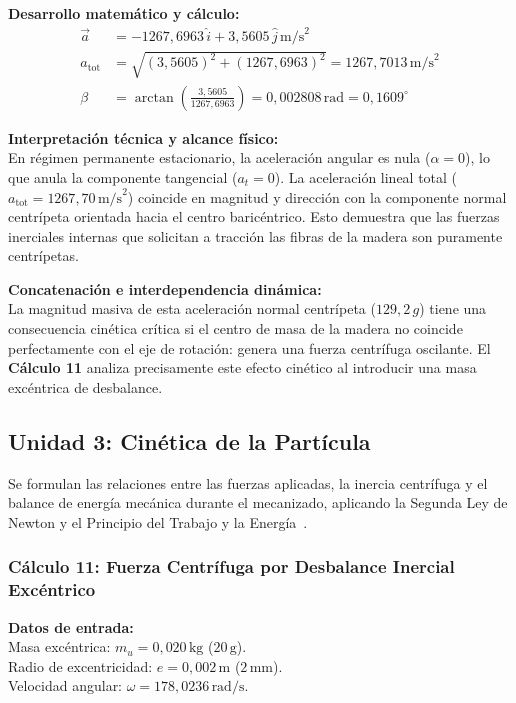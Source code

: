 \documentclass[12pt,a4paper]{article}
\begin{document}
\noindent\textbf{Desarrollo matemático y cálculo:}
\begin{align}
    \vec{a} &= -1267{,}6963\,\hat{i} + 3{,}5605\,\hat{j}\,\text{m/s}^2 \\[6pt]
    a_{\text{tot}} &= \sqrt{(3{,}5605)^2 + (1267{,}6963)^2} = \boxed{1267{,}7013\,\text{m/s}^2} \\[6pt]
    \beta &= \arctan\left(\frac{3{,}5605}{1267{,}6963}\right) = 0{,}002808\,\text{rad} = \boxed{0{,}1609^\circ}
\end{align}
\vspace{6pt}

\noindent\textbf{Interpretación técnica y alcance físico:}\\
En régimen permanente estacionario, la aceleración angular es nula ($\alpha = 0$), lo que anula la componente tangencial ($a_t = 0$). La aceleración lineal total ($a_{\text{tot}} = 1267{,}70\,\text{m/s}^2$) coincide en magnitud y dirección con la componente normal centrípeta orientada hacia el centro baricéntrico. Esto demuestra que las fuerzas inerciales internas que solicitan a tracción las fibras de la madera son puramente centrípetas.

\noindent\textbf{Concatenación e interdependencia dinámica:}\\
La magnitud masiva de esta aceleración normal centrípeta ($129{,}2\,g$) tiene una consecuencia cinética crítica si el centro de masa de la madera no coincide perfectamente con el eje de rotación: genera una fuerza centrífuga oscilante. El \textbf{Cálculo 11} analiza precisamente este efecto cinético al introducir una masa excéntrica de desbalance.

\subsection{Unidad 3: Cinética de la Partícula}
Se formulan las relaciones entre las fuerzas aplicadas, la inercia centrífuga y el balance de energía mecánica durante el mecanizado, aplicando la Segunda Ley de Newton y el Principio del Trabajo y la Energía~\cite{guia_dinamica, hibbeler2016}.

\subsubsection{Cálculo 11: Fuerza Centrífuga por Desbalance Inercial Excéntrico}

\noindent\textbf{Datos de entrada:}\\
Masa excéntrica: $m_u = 0{,}020\,\text{kg}$ ($20\,\text{g}$).\\
Radio de excentricidad: $e = 0{,}002\,\text{m}$ ($2\,\text{mm}$).\\
Velocidad angular: $\omega = 178{,}0236\,\text{rad/s}$.
\vspace{6pt}
\end{document}

